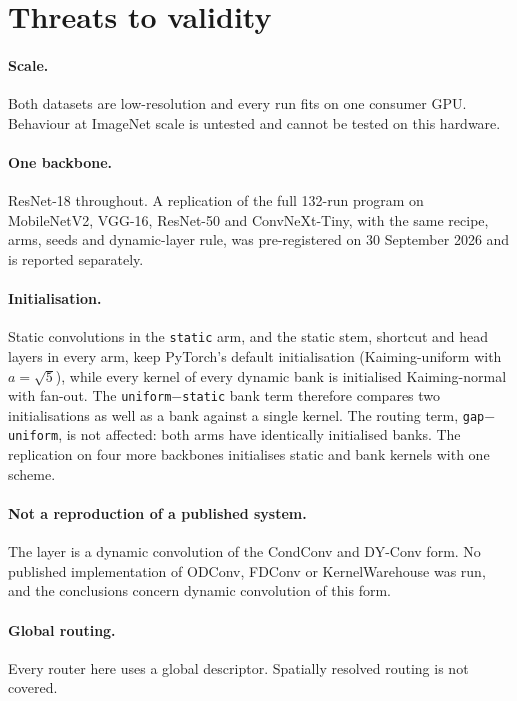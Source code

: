 \documentclass[10pt,a4paper]{article}
\begin{document}
\section{Threats to validity}

\paragraph{Scale.} Both datasets are low-resolution and every run fits on
one consumer GPU. Behaviour at ImageNet scale is untested and cannot be
tested on this hardware.

\paragraph{One backbone.} ResNet-18 throughout. A replication of the
full 132-run program on MobileNetV2, VGG-16, ResNet-50 and
ConvNeXt-Tiny, with the same recipe, arms, seeds and dynamic-layer rule,
was pre-registered on 30 September 2026 and is reported separately.

\paragraph{Initialisation.} Static convolutions in the \texttt{static}
arm, and the static stem, shortcut and head layers in every arm, keep
PyTorch's default initialisation (Kaiming-uniform with $a=\sqrt5$), while
every kernel of every dynamic bank is initialised Kaiming-normal with
fan-out. The \texttt{uniform}$-$\texttt{static} bank term therefore
compares two initialisations as well as a bank against a single kernel.
The routing term, \texttt{gap}$-$\texttt{uniform}, is not affected: both
arms have identically initialised banks. The replication on four more
backbones initialises static and bank kernels with one scheme.

\paragraph{Not a reproduction of a published system.} The layer is a
dynamic convolution of the CondConv and DY-Conv form. No published
implementation of ODConv, FDConv or KernelWarehouse was run, and the
conclusions concern dynamic convolution of this form.

\paragraph{Global routing.} Every router here uses a global descriptor.
Spatially resolved routing is not covered.
\end{document}
